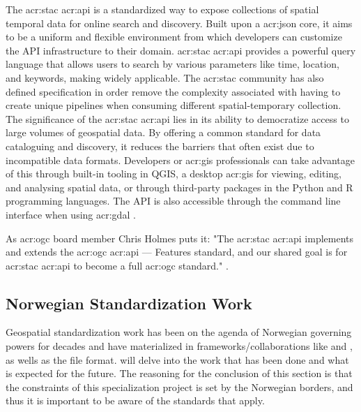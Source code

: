 The \gls{acr:stac} \acrshort{acr:api} is a standardized way to expose collections of spatial temporal data for online search and discovery. Built upon a \acrshort{acr:json} core, it aims to be a uniform and flexible environment from which developers can customize the API infrastructure to their domain. \gls{acr:stac} \acrshort{acr:api} provides a powerful query language that allows users to search by various parameters like time, location, and keywords, making widely applicable. The \acrshort{acr:stac} community has also defined specification in order remove the complexity associated with having to create unique pipelines when consuming different spatial-temporary collection. The significance of the \gls{acr:stac} \acrshort{acr:api} lies in its ability to democratize access to large volumes of geospatial data. By offering a common standard for data cataloguing and discovery, it reduces the barriers that often exist due to incompatible data formats. Developers or \acrshort{acr:gis} professionals can take advantage of this through built-in tooling in QGIS, a desktop \gls{acr:gis} for viewing, editing, and analysing spatial data, or through third-party packages in the Python and R programming languages. The API is also accessible through the command line interface when using \acrshort{acr:gdal} \citep{STACTutorials}.

As \acrshort{acr:ogc} board member Chris Holmes puts it: "The \acrshort{acr:stac} \acrshort{acr:api} implements and extends the \gls{acr:ogc} \acrshort{acr:api} — Features standard, and our shared goal is for \gls{acr:stac} \acrshort{acr:api} to become a full \gls{acr:ogc} standard." \citep{holmesSpatioTemporalAssetCatalogs2021}.

\subsection{Norwegian Standardization Work}\label{subsec:standardization-norway}


Geospatial standardization work has been on the agenda of Norwegian governing powers for decades and have materialized in frameworks/collaborations like  and , as wells as the  file format.  will delve into the work that has been done and what is expected for the future. The reasoning for the conclusion of this section is that the constraints of this specialization project is set by the Norwegian borders, and thus it is important to be aware of the standards that apply.

